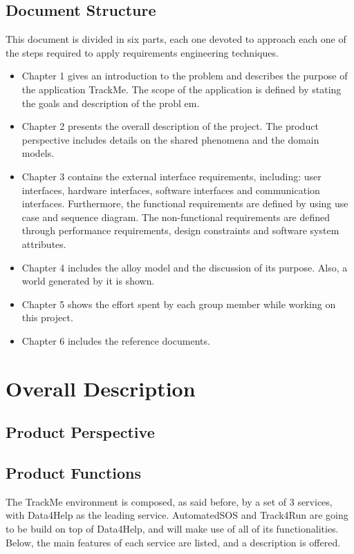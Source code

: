 \documentclass[12pt]{article}
\begin{document}
\subsection{Document Structure}
This document is divided in six parts, each one devoted to approach each one of the steps required to apply requirements engineering techniques.\\
\begin{itemize}
\item Chapter 1 gives an introduction to the problem and describes the purpose of the application TrackMe. The scope of the application is defined by stating the goals and description of the probl	em.
\item Chapter 2 presents the overall description of the project. The product perspective includes details on the shared phenomena and the domain models.
\item Chapter 3 contains the external interface requirements, including: user interfaces, hardware interfaces, software interfaces and communication interfaces. Furthermore, the functional requirements are defined by using use case and sequence diagram. The non-functional requirements are defined through performance requirements, design constraints and software system attributes.
\item Chapter 4 includes the alloy model and the discussion of its purpose. Also, a world generated by it is shown.
\item Chapter 5 shows the effort spent by each group member while working on this project.
\item Chapter 6 includes the reference documents.
\end{itemize}

\section{Overall Description}
\subsection{Product Perspective}
\subsection{Product Functions}
The TrackMe environment is composed, as said before, by a set of 3 services, with Data4Help as the leading service. AutomatedSOS and Track4Run are going to be build on top of Data4Help, and will make use of all of its functionalities. Below, the main features of each service are listed, and a description is offered.
\end{document}
